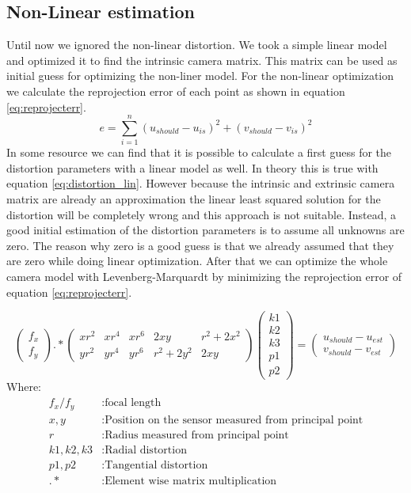 \documentclass[11pt,a4paper,titlepage,oneside]{report}
\begin{document}
\subsection{Non-Linear estimation}\label{sec:nonlinear_est}
Until now we ignored the non-linear distortion. We took a simple linear model and optimized it to find the intrinsic camera matrix. This matrix can be used as initial guess for optimizing the non-liner model. For the non-linear optimization we calculate the reprojection error of each point as shown in equation \ref{eq:reprojecterr}.
\begin{equation}\label{eq:reprojecterr}
	e=\sum\limits_{i=1}^n(u_{should}-u_{is})^2 +(v_{should}-v_{is})^2
\end{equation}
In some resource we can find that it is possible to calculate a first guess for the distortion parameters with a linear model as well. In theory this is true with equation \ref{eq:distortion_lin}.  However because the intrinsic and extrinsic camera matrix are already an approximation the linear least squared solution for the distortion will be completely wrong and this approach is not suitable. Instead, a good initial estimation of the distortion parameters is to assume all unknowns are zero. The reason why zero is a good guess is that we already assumed that they are zero while doing linear optimization. After that we can optimize the whole camera model with Levenberg-Marquardt by minimizing the reprojection error of equation \ref{eq:reprojecterr}.

\begin{equation}\label{eq:distortion_lin}
	\begin{pmatrix}
		f_x\\
		f_y
	\end{pmatrix}.*
	\begin{pmatrix}
		xr^2 & xr^4 & xr^6 & 2xy & r^2+2x^2 \\
		yr^2 & yr^4 & yr^6 & r^2+2y^2 & 2xy
	\end{pmatrix}
	\begin{pmatrix}
		k1\\k2\\k3\\p1\\p2
	\end{pmatrix}=
	\begin{pmatrix}
		u_{should}-u_{est}\\
		v_{should}-v_{est}
	\end{pmatrix}
\end{equation}
Where:
\begin{align*}
  f_x/f_y		&: \text{focal length}\\
	x,y				&: \text{Position on the sensor measured from principal point}\\
	r					&: \text{Radius measured from principal point}\\
	k1,k2,k3	&: \text{Radial distortion}\\
	p1,p2			&: \text{Tangential distortion}\\
	.*				&: \text{Element wise matrix multiplication}
\end{align*}
\end{document}
